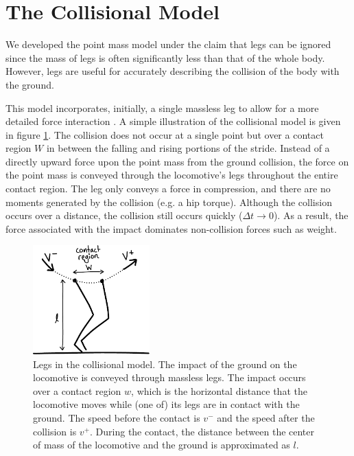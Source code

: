 \section{The Collisional Model} %
\label{sec:TheCollisionalModel}

We developed the point mass model under the claim that legs can be ignored since the mass of legs is often significantly less than that of the whole body. However, legs are useful for accurately describing the collision of the body with the ground.


This model incorporates, initially, a single massless leg to allow for a more detailed force interaction \cite{ruina05}. A simple illustration of the collisional model is given in figure \ref{fig:LegDiagram}. The collision does not occur at a single point but over a contact region $W$ in between the falling and rising portions of the stride. Instead of a directly upward force upon the point mass from the ground collision, the force on the point mass is conveyed through the locomotive's legs throughout the entire contact region. The leg only conveys a force in compression, and there are no moments generated by the collision (e.g. a hip torque). Although the collision occurs over a distance, the collision still occurs quickly ($\Delta t \rightarrow 0$). As a result, the force associated with the impact dominates non-collision forces such as weight.

\begin{figure}[h]		%
\begin{centering}
\includegraphics[width=0.4\textwidth]{Figures/LegDiagram}\par
\end{centering}
\caption[Diagram: Legs in the Collisional Model]{Legs in the collisional model. The impact of the ground on the locomotive is conveyed through massless legs. The impact occurs over a contact region $w$, which is the horizontal distance that the locomotive moves while (one of) its legs are in contact with the ground. The speed before the contact is $v^{-}$ and the speed after the collision is $v^{+}$. During the contact, the distance between the center of mass of the locomotive and the ground is approximated as $l$.}
\label{fig:LegDiagram}
\end{figure}
%

